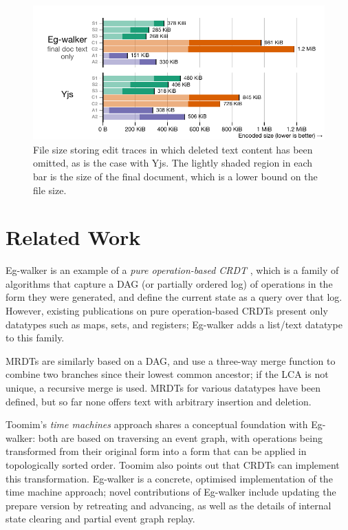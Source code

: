 \documentclass[sigplan,10pt]{acmart}
\newcommand{\algname}{Eg-walker\xspace}
\begin{document}
\begin{figure}
  \includegraphics[width=\linewidth]{diagrams/filesize_smol.pdf}
  \caption{File size storing edit traces in which deleted text content has been omitted, as is the case with Yjs. The lightly shaded region in each bar is the size of the final document, which is a lower bound on the file size.}
  \label{chart-dt-vs-yjs}
\end{figure}


\section{Related Work}\label{related-work}

\algname is an example of a \emph{pure operation-based CRDT} \cite{polog}, which is a family of algorithms that capture a DAG (or partially ordered log) of operations in the form they were generated, and define the current state as a query over that log.
However, existing publications on pure operation-based CRDTs \cite{Almeida2023,Bauwens2023} present only datatypes such as maps, sets, and registers; \algname adds a list/text datatype to this family.

MRDTs \cite{Soundarapandian2022} are similarly based on a DAG, and use a three-way merge function to combine two branches since their lowest common ancestor; if the LCA is not unique, a recursive merge is used.
MRDTs for various datatypes have been defined, but so far none offers text with arbitrary insertion and deletion.

Toomim's \emph{time machines} approach \cite{time-machines} shares a conceptual foundation with \algname: both are based on traversing an event graph, with operations being transformed from their original form into a form that can be applied in topologically sorted order.
Toomim also points out that CRDTs can implement this transformation.
\algname is a concrete, optimised implementation of the time machine approach; novel contributions of \algname include updating the prepare version by retreating and advancing, as well as the details of internal state clearing and partial event graph replay.
\end{document}
